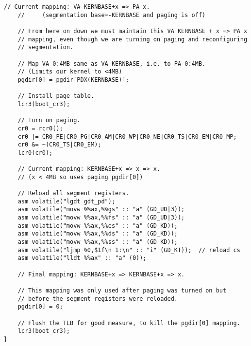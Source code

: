 \documentclass{article}
\begin{document}
\begin{CJK*}{UTF8}{gkai}
\begin{enumerate}
{\begin{lstlisting}[style=ccode, title={\scriptsize \ttfamily \bfseries kern/pmap.c: i386\_vm\_init ()}]
	// Current mapping: VA KERNBASE+x => PA x.
	//     (segmentation base=-KERNBASE and paging is off)

	// From here on down we must maintain this VA KERNBASE + x => PA x
	// mapping, even though we are turning on paging and reconfiguring
	// segmentation.

	// Map VA 0:4MB same as VA KERNBASE, i.e. to PA 0:4MB.
	// (Limits our kernel to <4MB)
	pgdir[0] = pgdir[PDX(KERNBASE)];

	// Install page table.
	lcr3(boot_cr3);

	// Turn on paging.
	cr0 = rcr0();
	cr0 |= CR0_PE|CR0_PG|CR0_AM|CR0_WP|CR0_NE|CR0_TS|CR0_EM|CR0_MP;
	cr0 &= ~(CR0_TS|CR0_EM);
	lcr0(cr0);

	// Current mapping: KERNBASE+x => x => x.
	// (x < 4MB so uses paging pgdir[0])

	// Reload all segment registers.
	asm volatile("lgdt gdt_pd");
	asm volatile("movw %%ax,%%gs" :: "a" (GD_UD|3));
	asm volatile("movw %%ax,%%fs" :: "a" (GD_UD|3));
	asm volatile("movw %%ax,%%es" :: "a" (GD_KD));
	asm volatile("movw %%ax,%%ds" :: "a" (GD_KD));
	asm volatile("movw %%ax,%%ss" :: "a" (GD_KD));
	asm volatile("ljmp %0,$1f\n 1:\n" :: "i" (GD_KT));  // reload cs
	asm volatile("lldt %%ax" :: "a" (0));

	// Final mapping: KERNBASE+x => KERNBASE+x => x.

	// This mapping was only used after paging was turned on but
	// before the segment registers were reloaded.
	pgdir[0] = 0;

	// Flush the TLB for good measure, to kill the pgdir[0] mapping.
	lcr3(boot_cr3);
}
\end{lstlisting}

}
\end{enumerate}
\end{CJK*}
\end{document}
